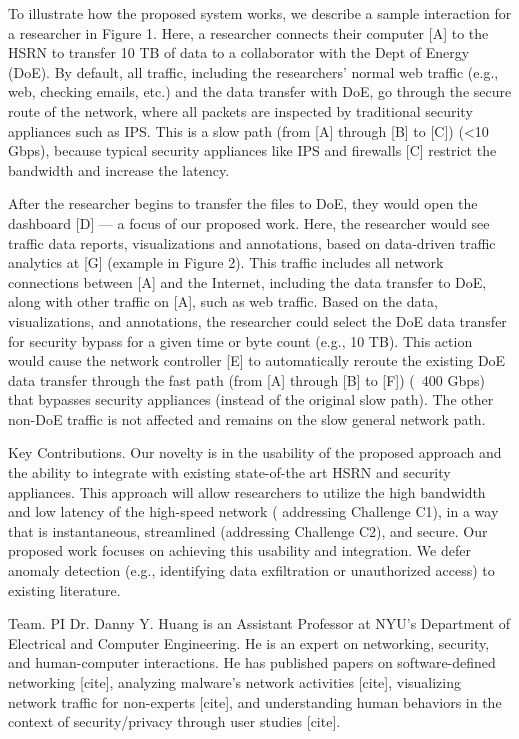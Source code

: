 To illustrate how the proposed system works, we describe a sample interaction for a researcher in Figure 1. Here, a researcher connects their computer [A] to the HSRN to transfer 10 TB of data to a collaborator with the Dept of Energy (DoE). By default, all traffic, including the researchers' normal web traffic (e.g., web, checking emails, etc.) and the data transfer with DoE, go through the secure route of the network, where all packets are inspected by traditional security appliances such as IPS. This is a slow path (from [A] through [B] to [C]) (<10 Gbps), because  typical security appliances like IPS and firewalls [C] restrict the bandwidth and increase the latency.

After the researcher begins to transfer the files to DoE, they would open the dashboard [D] — a focus of our proposed work. Here, the researcher would see traffic data reports, visualizations and annotations, based on data-driven traffic analytics at [G] (example in Figure 2). This traffic includes all network connections between [A] and the Internet, including the data transfer to DoE, along with other traffic on [A], such as web traffic. Based on the data, visualizations, and annotations, the researcher could select the DoE data transfer for security bypass for a given time or byte count (e.g., 10 TB). This action would cause the network controller [E] to automatically reroute  the existing DoE data transfer through the fast path (from [A] through [B] to [F]) (~400 Gbps) that bypasses security appliances (instead of the original slow path). The other non-DoE traffic is not affected and remains on the slow general network path.

Key Contributions. Our novelty is in the usability of the proposed approach and the ability to integrate with existing state-of-the art HSRN and security appliances. This approach will allow researchers to utilize the high bandwidth and low latency of the high-speed network ( addressing Challenge C1), in a way that is instantaneous, streamlined (addressing Challenge C2), and secure. Our proposed work focuses on achieving this usability and integration. We defer anomaly detection (e.g., identifying data exfiltration or unauthorized access) to existing literature.

Team. PI Dr. Danny Y. Huang is an Assistant Professor at NYU's Department of Electrical and Computer Engineering. He is an expert on networking, security, and human-computer interactions. He has published papers on software-defined networking [cite], analyzing malware's network activities [cite], visualizing network traffic for non-experts [cite], and understanding human behaviors in the context of security/privacy through user studies [cite].

